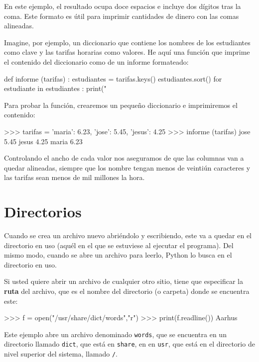 En este ejemplo, el resultado ocupa doce espacios e incluye dos dígitos
tras la coma. Este formato es útil para imprimir cantidades de dinero
con las comas alineadas.


Imagine, por ejemplo, un diccionario que contiene los nombres de los
estudiantes como clave y las tarifas horarias como valores. He aquí
una función que imprime el contenido del diccionario como de un informe
formateado:
\begin{pythoncode}
def informe (tarifas) :
  estudiantes = tarifas.keys()
  estudiantes.sort()
  for estudiante in estudiantes :
    print("%
\end{pythoncode}

Para probar la función, crearemos un pequeño diccionario e imprimiremos
el contenido:
\begin{pyconcode}
>>> tarifas = {'maria': 6.23, 'jose': 5.45, 'jesus': 4.25}
>>> informe (tarifas)
jose                         5.45
jesus                        4.25
maria                        6.23
\end{pyconcode}

Controlando el ancho de cada valor nos aseguramos de que las columnas
van a quedar alineadas, siempre que los nombre tengan menos de veintiún
caracteres y las tarifas sean menos de mil millones la hora.

\section{Directorios}


Cuando se crea un archivo nuevo abriéndolo y escribiendo, este va
a quedar en el directorio en uso (aquél en el que se estuviese al
ejecutar el programa). Del mismo modo, cuando se abre un archivo para
leerlo, Python lo busca en el directorio en uso.

Si usted quiere abrir un archivo de cualquier otro sitio, tiene que
especificar la \textbf{ruta} del archivo, que es el nombre del directorio
(o carpeta) donde se encuentra este:
\begin{pyconcode}
>>>   f = open("/usr/share/dict/words","r")
>>>   print(f.readline())
Aarhus
\end{pyconcode}

Este ejemplo abre un archivo denominado \texttt{words}, que se encuentra
en un directorio llamado \texttt{dict}, que está en \texttt{share},
en en \texttt{usr}, que está en el directorio de nivel superior del
sistema, llamado \texttt{/}.

